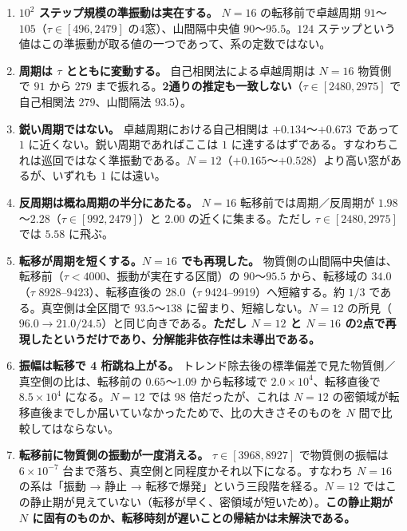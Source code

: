 \documentclass[
  10pt,
]{ltjsarticle}
\providecommand{\tightlist}{%
  \setlength{\itemsep}{0pt}\setlength{\parskip}{0pt}}
\begin{document}
\begin{enumerate}
\def\labelenumi{\arabic{enumi}.}
\tightlist
\item
  \textbf{\(10^2\) ステップ規模の準振動は実在する。} \(N=16\)
  の転移前で卓越周期 \(91\)〜\(105\)（\(\tau\in[496,2479]\)
  の4窓）、山間隔中央値 \(90\)〜\(95.5\)。\(124\)
  ステップという値はこの準振動が取る値の一つであって、系の定数ではない。
\item
  \textbf{周期は \(\tau\) とともに変動する。} 自己相関法による卓越周期は
  \(N=16\) 物質側で \(91\) から \(279\)
  まで振れる。\textbf{2通りの推定も一致しない}（\(\tau\in[2480,2975]\)
  で自己相関法 \(279\)、山間隔法 \(93.5\)）。
\item
  \textbf{鋭い周期ではない。} 卓越周期における自己相関は
  \(+0.134\)〜\(+0.673\) であって \(1\)
  に近くない。鋭い周期であればここは \(1\)
  に達するはずである。すなわちこれは巡回ではなく準振動である。\(N=12\)（\(+0.165\)〜\(+0.528\)）より高い窓があるが、いずれも
  \(1\) には遠い。
\item
  \textbf{反周期は概ね周期の半分にあたる。} \(N=16\)
  転移前では周期／反周期が \(1.98\)〜\(2.28\)（\(\tau\in[992,2479]\)）と
  \(2.00\) の近くに集まる。ただし \(\tau\in[2480,2975]\) では \(5.58\)
  に飛ぶ。
\item
  \textbf{転移が周期を短くする。\(N=16\) でも再現した。}
  物質側の山間隔中央値は、転移前（\(\tau<4000\)、振動が実在する区間）の
  \(90\)〜\(95.5\) から、転移域の \(\mathbf{34.0}\)（\(\tau\)
  8928--9423）、転移直後の \(\mathbf{28.0}\)（\(\tau\)
  9424--9919）へ短縮する。約 \(1/3\) である。真空側は全区間で
  \(93.5\)〜\(138\) に留まり、短縮しない。\(N=12\)
  の所見（\(96.0 \to 21.0/24.5\)）と同じ向きである。\textbf{ただし
  \(N=12\) と \(N=16\)
  の2点で再現したというだけであり、分解能非依存性は未導出である。}
\item
  \textbf{振幅は転移で 4 桁跳ね上がる。}
  トレンド除去後の標準偏差で見た物質側／真空側の比は、転移前の
  \(0.65\)〜\(1.09\) から転移域で \(2.0\times10^{4}\)、転移直後で
  \(8.5\times10^{4}\) になる。\(N=12\) では 98 倍だったが、これは
  \(N=12\)
  の密領域が転移直後までしか届いていなかったためで、比の大きさそのものを
  \(N\) 間で比較してはならない。
\item
  \textbf{転移前に物質側の振動が一度消える。} \(\tau\in[3968,8927]\)
  で物質側の振幅は \(6\times10^{-7}\)
  台まで落ち、真空側と同程度かそれ以下になる。すなわち \(N=16\)
  の系は「振動 → 静止 → 転移で爆発」という三段階を経る。\(N=12\)
  ではこの静止期が見えていない（転移が早く、密領域が短いため）。\textbf{この静止期が
  \(N\) に固有のものか、転移時刻が遅いことの帰結かは未解決である。}
\end{enumerate}
\end{document}
